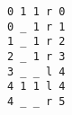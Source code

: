 \begin{verbatim}
0 1 1 r 0
0 _ 1 r 1
1 _ 1 r 2
2 _ 1 r 3
3 _ _ l 4
4 1 1 l 4
4 _ _ r 5
\end{verbatim}